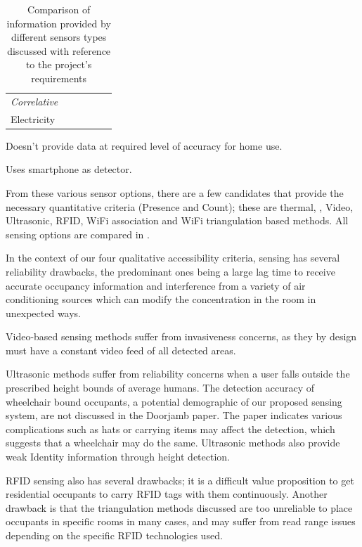 \documentclass[../thesis/thesis.tex]{subfiles}
\begin{document}
\begin{table}[h]
\begin{threeparttable}
\begin{tabularx}{\textwidth}{|l|l|l||l||l|l|}
\hspace{3mm}\textit{Correlative} 	& & & & & \\
\hspace{8mm}Electricity 		& \cmark\ssup & \xmark & \cmark & & \\

\cline{1-6}
\end{tabularx}
\begin{tablenotes}
\item \ssup  Doesn't provide data at required level of accuracy for home use.
\item \tsup  Uses smartphone as detector.
\end{tablenotes}
\end{threeparttable}
\caption{Comparison of information provided by different sensors types discussed with reference to the project's requirements}
\label{tab:litreview:taxonomycomp}
\end{table}

From these various sensor options, there are a few candidates that provide the necessary quantitative criteria (Presence and Count); these are thermal, \cdi, Video, Ultrasonic, RFID, WiFi association and WiFi triangulation based methods. All sensing options are compared in .

In the context of our four qualitative accessibility criteria, \cdi sensing has several reliability drawbacks, the predominant ones being a large lag time to receive accurate occupancy information and interference from a variety of air conditioning sources which can modify the \cdi concentration in the room in unexpected ways.

Video-based sensing methods suffer from invasiveness concerns, as they by design must have a constant video feed of all detected areas.

Ultrasonic methods suffer from reliability concerns when a user falls outside the prescribed height bounds of average humans. The detection accuracy of wheelchair bound occupants, a potential demographic of our proposed sensing system, are not discussed in the Doorjamb paper. The paper indicates various complications such as hats or carrying items may affect the detection, which suggests that a wheelchair may do the same. Ultrasonic methods also provide weak Identity information through height detection.

RFID sensing also has several drawbacks; it is a difficult value proposition to get residential occupants to carry RFID tags with them continuously. Another drawback is that the triangulation methods discussed are too unreliable to place occupants in specific rooms in many cases, and may suffer from read range issues depending on the specific RFID technologies used.
\end{document}

